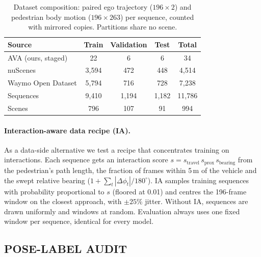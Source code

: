 \documentclass{ieeeoj}
\begin{document}
\begin{table}[t]
  \centering
  \caption{Dataset composition: paired ego trajectory ($196\times2$) and pedestrian body motion ($196\times263$) per sequence, counted with mirrored copies. Partitions share no scene.}
  \label{tab:dataset}
  \vspace{4pt}
  \small
  \setlength{\tabcolsep}{6pt}
  \begin{tabular}{lcccc}
    \toprule
    Source & Train & Validation & Test & Total \\
    \midrule
    AVA (ours, staged) & 22 & 6 & 6 & 34 \\
    nuScenes & 3{,}594 & 472 & 448 & 4{,}514 \\
    Waymo Open Dataset & 5{,}794 & 716 & 728 & 7{,}238 \\
    \midrule
    Sequences & 9{,}410 & 1{,}194 & 1{,}182 & 11{,}786 \\
    Scenes & 796 & 107 & 91 & 994 \\
    \bottomrule
  \end{tabular}
\end{table}

\paragraph{Interaction-aware data recipe (IA).}
As a data-side alternative we test a recipe that concentrates training on interactions. Each sequence gets an interaction score $s = s_{\text{travel}}\, s_{\text{prox}}\, s_{\text{bearing}}$ from the pedestrian's path length, the fraction of frames within 5\,m of the vehicle and the swept relative bearing ($1 + \sum_t|\Delta\phi_t|/180^\circ$). IA samples training sequences with probability proportional to $s$ (floored at 0.01) and centres the 196-frame window on the closest approach, with $\pm25\%$ jitter. Without IA, sequences are drawn uniformly and windows at random. Evaluation always uses one fixed window per sequence, identical for every model.

\subsection{POSE-LABEL AUDIT}
\label{sec:posequality}
\end{document}
